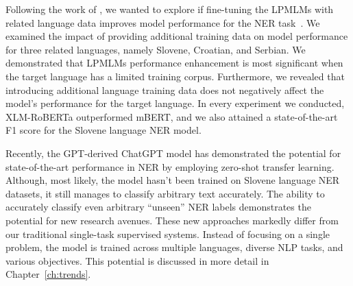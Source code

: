 Following the work of \textcite{prelevikj-zitnik-2021-multilingual}, we wanted to explore if fine-tuning the LPMLMs with related language data improves model performance for the NER task~\parencite{ivacic2023analysis}. 
We examined the impact of providing additional training data on model performance for three related languages, namely Slovene, Croatian, and Serbian.
We demonstrated that LPMLMs performance enhancement is most significant when the target language has a limited training corpus. 
Furthermore, we revealed that introducing additional language training data does not negatively affect the model's performance for the target language.
In every experiment we conducted, XLM-RoBERTa outperformed mBERT, and we also attained a state-of-the-art F1 score for the Slovene language NER model.

Recently, the GPT-derived ChatGPT model has demonstrated the potential for state-of-the-art performance in NER by employing zero-shot transfer learning.
Although, most likely, the model hasn't been trained on Slovene language NER datasets, it still manages to classify arbitrary text accurately.
The ability to accurately classify even arbitrary ``unseen'' NER labels demonstrates the potential for new research avenues. 
These new approaches markedly differ from our traditional single-task supervised systems. 
Instead of focusing on a single problem, the model is trained across multiple languages, diverse NLP tasks, and various objectives.
This potential is discussed in more detail in Chapter~\ref{ch:trends}.
